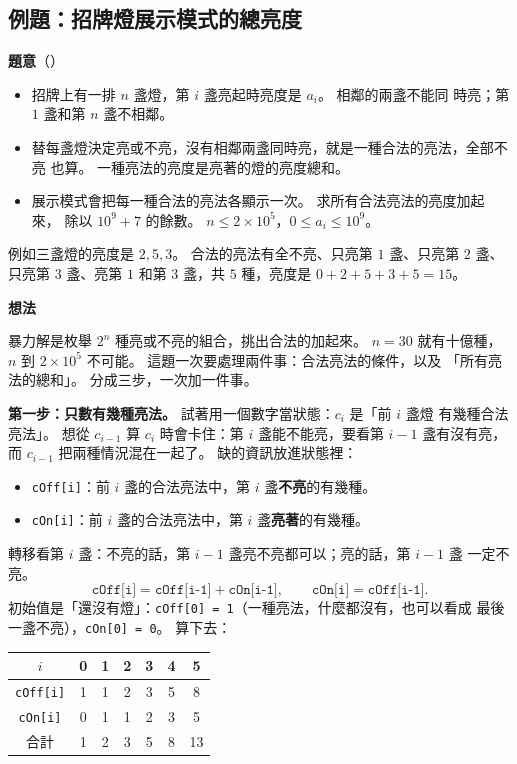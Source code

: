 \subsection{例題：招牌燈展示模式的總亮度}
\label{sec:ex-sign}

\textbf{題意}（）

\begin{itemize}
\item 招牌上有一排 $n$ 盞燈，第 $i$ 盞亮起時亮度是 $a_i$。 相鄰的兩盞不能同
時亮；第 $1$ 盞和第 $n$ 盞不相鄰。
\item 替每盞燈決定亮或不亮，沒有相鄰兩盞同時亮，就是一種合法的亮法，全部不亮
也算。 一種亮法的亮度是亮著的燈的亮度總和。
\item 展示模式會把每一種合法的亮法各顯示一次。 求所有合法亮法的亮度加起來，
除以 $10^9 + 7$ 的餘數。 $n \le 2 \times 10^5$，$0 \le a_i \le 10^9$。
\end{itemize}

例如三盞燈的亮度是 $2, 5, 3$。 合法的亮法有全不亮、只亮第 $1$ 盞、只亮第
$2$ 盞、只亮第 $3$ 盞、亮第 $1$ 和第 $3$ 盞，共 $5$ 種，亮度是 $0 + 2 + 5 +
3 + 5 = 15$。

\textbf{想法}

暴力解是枚舉 $2^n$ 種亮或不亮的組合，挑出合法的加起來。 $n = 30$ 就有十億種，
$n$ 到 $2 \times 10^5$ 不可能。 這題一次要處理兩件事：合法亮法的條件，以及
「所有亮法的總和」。 分成三步，一次加一件事。

\textbf{第一步：只數有幾種亮法。} 試著用一個數字當狀態：$c_i$ 是「前 $i$ 盞燈
有幾種合法亮法」。 想從 $c_{i-1}$ 算 $c_i$ 時會卡住：第 $i$ 盞能不能亮，要看第
$i - 1$ 盞有沒有亮，而 $c_{i-1}$ 把兩種情況混在一起了。 缺的資訊放進狀態裡：

\begin{itemize}
\item \texttt{cOff[i]}：前 $i$ 盞的合法亮法中，第 $i$ 盞\textbf{不亮}的有幾種。
\item \texttt{cOn[i]}：前 $i$ 盞的合法亮法中，第 $i$ 盞\textbf{亮著}的有幾種。
\end{itemize}

轉移看第 $i$ 盞：不亮的話，第 $i - 1$ 盞亮不亮都可以；亮的話，第 $i - 1$ 盞
一定不亮。
\[
\texttt{cOff[i]} = \texttt{cOff[i-1]} + \texttt{cOn[i-1]},\qquad
\texttt{cOn[i]} = \texttt{cOff[i-1]}.
\]
初始值是「還沒有燈」：\texttt{cOff[0] = 1}（一種亮法，什麼都沒有，也可以看成
最後一盞不亮），\texttt{cOn[0] = 0}。 算下去：

\begin{center}
\begin{tabular}{c|cccccc}
\toprule
$i$ & 0 & 1 & 2 & 3 & 4 & 5 \\
\midrule
\texttt{cOff[i]} & 1 & 1 & 2 & 3 & 5 & 8 \\
\texttt{cOn[i]} & 0 & 1 & 1 & 2 & 3 & 5 \\
合計 & 1 & 2 & 3 & 5 & 8 & 13 \\
\bottomrule
\end{tabular}
\end{center}

